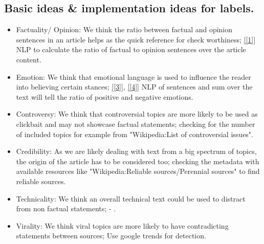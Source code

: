 \documentclass[10pt]{article}
\begin{document}
\subsection{Basic ideas \& implementation ideas for labels.}
\begin{itemize}
\item Factuality/ Opinion: We think the ratio between factual and opinion sentences in an article helps as the quick reference for check worthiness;
\ref{[1]} NLP to calculate the ratio of factual to opinion sentences over the article content.
\item Emotion: We think that emotional language is used to influence the reader into believing certain stances; \ref{[3]}, \ref{[4]} NLP of sentences and sum over the text will tell the ratio of positive and negative emotions.
\item Controversy: We think that controversial topics are more likely to be used as clickbait and may not showcase factual statements; checking for the number of included topics for example from "Wikipedia:List of controversial issues".
\item Credibility: As we are likely dealing with text from a big spectrum of topics, the origin of the article has to be considered too; checking the metadata with available resources like  "Wikipedia:Reliable sources/Perennial sources" to find reliable sources.
\item Technicality: We think an overall technical text could be used to distract from non factual statements; - .
\item Virality: We think viral topics are more likely to have contradicting statements between sources; Use google trends for detection.
\end{itemize}


\end{document}
